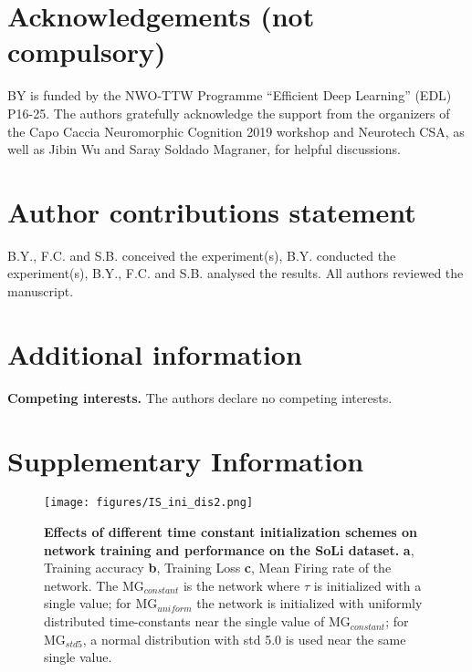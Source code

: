 \documentclass[fleqn,10pt]{wlscirep}
\begin{document}








\section*{Acknowledgements (not compulsory)}



BY is funded by the NWO-TTW Programme “Efficient Deep Learning” (EDL) P16-25.
The authors gratefully acknowledge the support from the organizers of the Capo Caccia Neuromorphic Cognition 2019 workshop and Neurotech CSA, as well as Jibin Wu and Saray Soldado Magraner, for helpful discussions.

\section*{Author contributions statement}
B.Y., F.C. and S.B. conceived the experiment(s),  B.Y. conducted the experiment(s), B.Y., F.C. and S.B. analysed the results. All authors reviewed the manuscript. 

\section*{Additional information}
\textbf{Competing interests.} The authors declare no competing interests. 





\newpage




\renewcommand{\thepage}{S\arabic{page}} 
\renewcommand{\thesection}{S\arabic{section}}  
\renewcommand{\thetable}{S\arabic{table}}  
\renewcommand{\thefigure}{S\arabic{figure}}
\renewcommand{\figurename}{Figure}
\setcounter{figure}{0} 
\setcounter{table}{0} 
\section*{Supplementary Information}





\begin{figure*}[hbp]
    \centering
    \texttt{[image: figures/IS\_ini\_dis2.png]}
    \caption{\textbf{Effects of different time constant initialization schemes on network training and performance on the SoLi dataset.} \textbf{a}, Training accuracy \textbf{b}, Training Loss \textbf{c}, Mean Firing rate of the network. The MG$_{constant}$ is the network where $\tau$ is initialized with a single value; for  MG$_{uniform}$ the network is initialized with uniformly distributed time-constants near the single value of MG$_{constant}$; for MG$_{std5}$, a normal distribution with std 5.0 is used near the same single value.}
    \label{fig:SoLi-ini}
\end{figure*}
\end{document}
